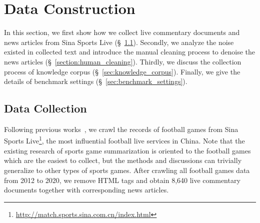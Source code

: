   
\section{Data Construction}
In this section, we first show how we collect live commentary documents and news articles from Sina Sports Live (\S~\ref{sec:data_collection}).
Secondly, we analyze the noise existed in collected text and introduce the manual cleaning process to denoise the news articles (\S~\ref{section:human_cleaning}).
Thirdly, we discuss the collection process of knowledge corpus (\S~\ref{sec:knowledge_corpus}).
Finally, we give the details of benchmark settings (\S~\ref{sec:benchmark_settings}).

\subsection{Data Collection}
\label{sec:data_collection}
Following previous works~\cite{zhang-etal-2016-towards,Wan2016OverviewOT,Huang2020GeneratingSN}, we crawl the records of football games from Sina Sports Live\footnote{\url{http://match.sports.sina.com.cn/index.html}}, the most influential football live services in China.
Note that the existing research of sports game summarization is oriented to the football games which are the easiest to collect, but the methods and discussions can trivially generalize to other types of sports games.
After crawling all football games data from 2012 to 2020, we remove HTML tags and obtain 8,640 live commentary documents together with corresponding news articles.

